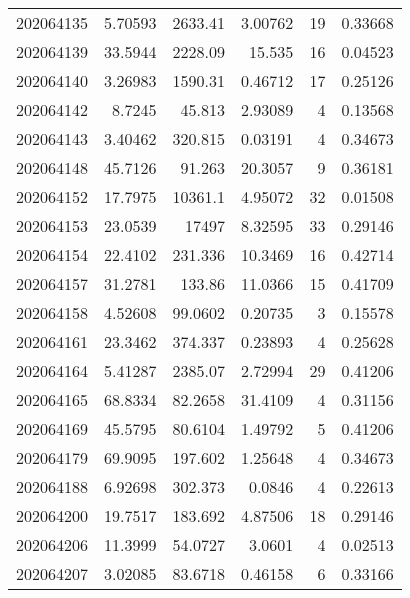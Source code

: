 \begin{tabular}{rrrrrr}
 202064135 &          5.70593 &     2633.41   &            3.00762 &          19 & 0.33668 \\
 202064139 &         33.5944  &     2228.09   &           15.535   &          16 & 0.04523 \\
 202064140 &          3.26983 &     1590.31   &            0.46712 &          17 & 0.25126 \\
 202064142 &          8.7245  &       45.813  &            2.93089 &           4 & 0.13568 \\
 202064143 &          3.40462 &      320.815  &            0.03191 &           4 & 0.34673 \\
 202064148 &         45.7126  &       91.263  &           20.3057  &           9 & 0.36181 \\
 202064152 &         17.7975  &    10361.1    &            4.95072 &          32 & 0.01508 \\
 202064153 &         23.0539  &    17497      &            8.32595 &          33 & 0.29146 \\
 202064154 &         22.4102  &      231.336  &           10.3469  &          16 & 0.42714 \\
 202064157 &         31.2781  &      133.86   &           11.0366  &          15 & 0.41709 \\
 202064158 &          4.52608 &       99.0602 &            0.20735 &           3 & 0.15578 \\
 202064161 &         23.3462  &      374.337  &            0.23893 &           4 & 0.25628 \\
 202064164 &          5.41287 &     2385.07   &            2.72994 &          29 & 0.41206 \\
 202064165 &         68.8334  &       82.2658 &           31.4109  &           4 & 0.31156 \\
 202064169 &         45.5795  &       80.6104 &            1.49792 &           5 & 0.41206 \\
 202064179 &         69.9095  &      197.602  &            1.25648 &           4 & 0.34673 \\
 202064188 &          6.92698 &      302.373  &            0.0846  &           4 & 0.22613 \\
 202064200 &         19.7517  &      183.692  &            4.87506 &          18 & 0.29146 \\
 202064206 &         11.3999  &       54.0727 &            3.0601  &           4 & 0.02513 \\
 202064207 &          3.02085 &       83.6718 &            0.46158 &           6 & 0.33166 \\

\end{tabular}
